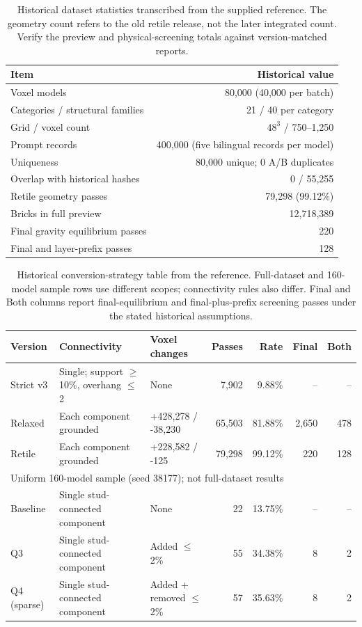 \begin{table}[!htbp]\centering\small
\begin{tabular}{lr}\toprule
Item & Historical value \\ \midrule
Voxel models & 80,000 (40,000 per batch) \\
Categories / structural families & 21 / 40 per category \\
Grid / voxel count & $48^3$ / 750--1,250 \\
Prompt records & 400,000 (five bilingual records per model) \\
Uniqueness & 80,000 unique; 0 A/B duplicates \\
Overlap with historical hashes & 0 / 55,255 \\
Retile geometry passes & 79,298 (99.12\%) \\
Bricks in full preview & 12,718,389 \\
Final gravity equilibrium passes & 220 \\
Final and layer-prefix passes & 128 \\
\bottomrule\end{tabular}
\caption{Historical dataset statistics transcribed from the supplied reference. The geometry count refers to the old retile release, not the later integrated count. Verify the preview and physical-screening totals against version-matched reports.}
\end{table}

\begin{table}[!htbp]\centering\small
\setlength{\tabcolsep}{3pt}
\begin{tabular}{@{}l>{\raggedright\arraybackslash}p{3.9cm}>{\raggedright\arraybackslash}p{2.5cm}rrrr@{}}\toprule
Version & Connectivity & Voxel changes & Passes & Rate & Final & Both \\ \midrule
Strict v3 & Single; support $\geq$10\%, overhang $\leq$2 & None & 7,902 & 9.88\% & -- & -- \\
Relaxed & Each component grounded & +428,278 / -38,230 & 65,503 & 81.88\% & 2,650 & 478 \\
Retile & Each component grounded & +228,582 / -125 & 79,298 & 99.12\% & 220 & 128 \\
\midrule
\multicolumn{7}{l}{Uniform 160-model sample (seed 38177); not full-dataset results} \\
Baseline & Single stud-connected component & None & 22 & 13.75\% & -- & -- \\
Q3 & Single stud-connected component & Added $\leq$2\% & 55 & 34.38\% & 8 & 2 \\
Q4 (sparse) & Single stud-connected component & Added + removed $\leq$2\% & 57 & 35.63\% & 8 & 2 \\
\bottomrule\end{tabular}
\caption{Historical conversion-strategy table from the reference. Full-dataset and 160-model sample rows use different scopes; connectivity rules also differ. Final and Both columns report final-equilibrium and final-plus-prefix screening passes under the stated historical assumptions.}
\end{table}

